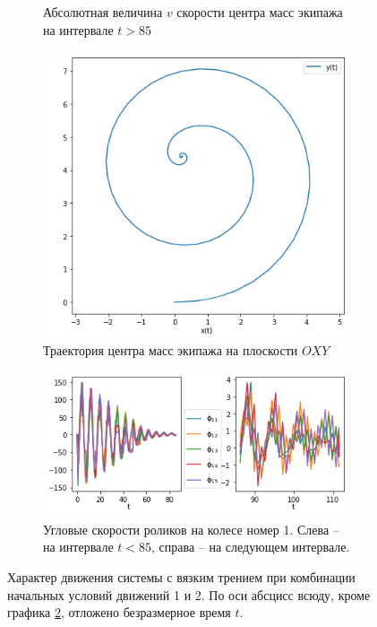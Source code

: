 \begin{figure}[htb]
\begin{subfigure}[t]{\textwidth}
            \vspace{-25pt}
            \caption{Абсолютная величина $v$ скорости центра масс экипажа на интервале $t > 85$}
            \label{fig:visc_v_late}
        \end{subfigure}
    \endminipage
    \quad
        \begin{subfigure}[t]{\textwidth}
            \centering
            \includegraphics[width=\linewidth]{content/pic/new/viscous/visc_3_100_traj.png}
            \vspace{-25pt}
            \caption{Траектория центра масс экипажа на плоскости $OXY$}
            \label{fig:visc_traj}
        \end{subfigure}
        \begin{subfigure}[t]{\textwidth}
            \vspace{20pt}
            \centering
            \includegraphics[width=\linewidth]{content/pic/new/viscous/visc_3_100_dphi.png}
            \vspace{-25pt}
            \caption{Угловые скорости роликов на колесе номер 1. Слева -- на интервале $t < 85$, справа -- на следующем интервале.}
            \label{fig:visc_dphi}
        \end{subfigure}
    \endminipage

    \caption{Характер движения системы с вязким трением при комбинации начальных условий движений 1 и 2. По оси абсцисс всюду, кроме графика \ref{fig:visc_traj}, отложено безразмерное время $t$.}
    \label{fig:viscous}
\end{figure}
